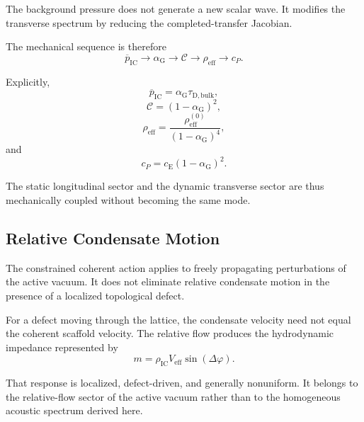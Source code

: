 The background pressure does not generate a new scalar wave. It modifies the transverse spectrum by reducing the completed-transfer Jacobian.

The mechanical sequence is therefore
\begin{equation}
    \boxed{ \overline{p}_{\mathrm{IC}} \longrightarrow \alpha_{\mathrm{G}} \longrightarrow \mathcal{C} \longrightarrow \rho_{\mathrm{eff}} \longrightarrow c_P }.
\end{equation}

Explicitly,
\begin{equation}
    \overline{p}_{\mathrm{IC}} = \alpha_{\mathrm{G}} \tau_{\mathrm{D,bulk}},
\end{equation}
\begin{equation}
    \mathcal{C} = \left( 1-\alpha_{\mathrm{G}} \right)^2,
\end{equation}
\begin{equation}
    \rho_{\mathrm{eff}} = \frac{ \rho_{\mathrm{eff}}^{(0)} }{ \left( 1-\alpha_{\mathrm{G}} \right)^4 },
\end{equation}
and
\begin{equation}
    c_P = c_{\mathrm{E}} \left( 1-\alpha_{\mathrm{G}} \right)^2.
\end{equation}

The static longitudinal sector and the dynamic transverse sector are thus mechanically coupled without becoming the same mode.

\subsection{Relative Condensate Motion}

The constrained coherent action applies to freely propagating perturbations of the active vacuum. It does not eliminate relative condensate motion in the presence of a localized topological defect.

For a defect moving through the lattice, the condensate velocity need not equal the coherent scaffold velocity. The relative flow produces the hydrodynamic impedance represented by
\begin{equation}
    m = \rho_{\mathrm{IC}} V_{\mathrm{eff}} \sin(\Delta\varphi).
\end{equation}

That response is localized, defect-driven, and generally nonuniform. It belongs to the relative-flow sector of the active vacuum rather than to the homogeneous acoustic spectrum derived here.

